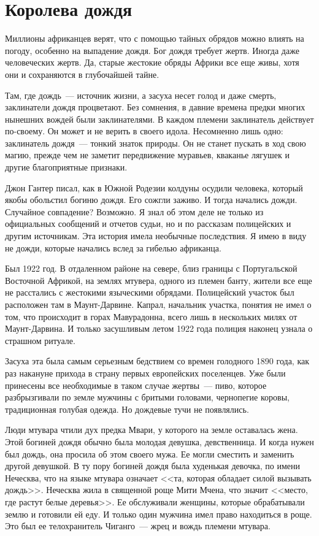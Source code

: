 \documentclass[12pt,a4paper,twoside,openany,svgnames]{memoir}
\begin{document}
\chapter{Королева дождя}

Миллионы африканцев верят, что с помощью тайных обрядов можно влиять на погоду, особенно на выпадение дождя. Бог дождя требует жертв. Иногда даже человеческих жертв. Да, старые жестокие обряды Африки все еще живы, хотя они и сохраняются в глубочайшей тайне.

Там, где дождь~--- источник жизни, а засуха несет голод и даже смерть, заклинатели дождя процветают. Без сомнения, в давние времена предки многих нынешних вождей были заклинателями. В каждом племени заклинатель действует по-своему. Он может и не верить в своего идола. Несомненно лишь одно: заклинатель дождя~--- тонкий знаток природы. Он не станет пускать в ход свою магию, прежде чем не заметит передвижение муравьев, кваканье лягушек и другие благоприятные признаки.

Джон Гантер писал, как в Южной Родезии колдуны осудили человека, который якобы обольстил богиню дождя. Его сожгли заживо. И тогда начались дожди. Случайное совпадение? Возможно. Я знал об этом деле не только из официальных сообщений и отчетов судьи, но и по рассказам полицейских и другим источникам. Эта история имела необычные последствия. Я имею в виду не дожди, которые начались вслед за гибелью африканца.

Был 1922 год. В отдаленном районе на севере, близ границы с Португальской Восточной Африкой, на землях мтувера, одного из племен банту, жители все еще не расстались с жестокими языческими обрядами. Полицейский участок был расположен там в Маунт-Дарвине. Капрал, начальник участка, понятия не имел о том, что происходит в горах Мавурадонна, всего лишь в нескольких милях от Маунт-Дарвина. И только засушливым летом 1922 года полиция наконец узнала о страшном ритуале.

Засуха эта была самым серьезным бедствием со времен голодного 1890 года, как раз накануне прихода в страну первых европейских поселенцев. Уже были принесены все необходимые в таком случае жертвы~--- пиво, которое разбрызгивали по земле мужчины с бритыми головами, чернопегие коровы, традиционная голубая одежда. Но дождевые тучи не появлялись.

Люди мтувара чтили дух предка Мвари, у которого на земле оставалась жена. Этой богиней дождя обычно была молодая девушка, девственница. И когда нужен был дождь, она просила об этом своего мужа. Ее могли сместить и заменить другой девушкой. В ту пору богиней дождя была худенькая девочка, по имени Неческва, что на языке мтувара означает <<та, которая обладает силой вызывать дождь>>. Неческва жила в священной роще Мити Мчена, что значит <<место, где растут белые деревья>>. Ее обслуживали женщины, которые обрабатывали землю и готовили ей еду. И только один мужчина имел право находиться в роще. Это был ее телохранитель Чиганго~--- жрец и вождь племени мтувара.
\end{document}
